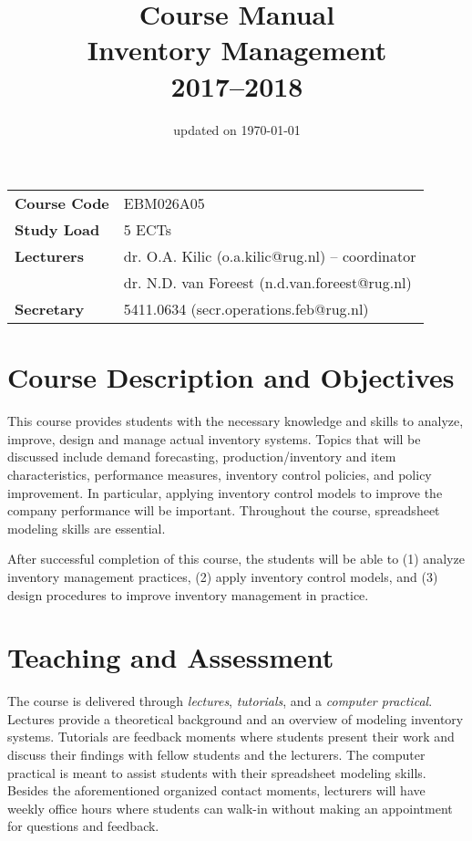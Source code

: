 \documentclass{article}
\title{\bf
	Course Manual \\ 
	Inventory Management \\
	{\normalsize 2017--2018}}
\date{\small updated on \today}
\author{\empty}
\begin{document}
\maketitle

\begin{table}[htbp]
    \begin{tabular}{ll}
    \textbf{Course Code}  	& EBM026A05 \\
    \textbf{Study Load} 	& 5 ECTs \\
    \textbf{Lecturers} 		& dr. O.A. Kilic (o.a.kilic@rug.nl) -- coordinator \\ 
    		  				& dr. N.D. van Foreest (n.d.van.foreest@rug.nl) \\
    \textbf{Secretary} 		& 5411.0634 (secr.operations.feb@rug.nl) \\
    \end{tabular}%
\end{table}%


\setcounter{tocdepth}{2}
\setlength\cftbeforesecskip{2.5pt}
{\small\tableofcontents}

\newpage

\section{Course Description and Objectives}

This course provides students with the necessary knowledge and skills to analyze, improve, design and manage actual inventory systems. Topics that will be discussed include demand forecasting, production/inventory and item characteristics, performance measures, inventory control policies, and policy improvement. In particular, applying inventory control models to improve the company performance will be important. Throughout the course, spreadsheet modeling skills are essential.

After successful completion of this course, the students will be able to (1) analyze inventory management practices, (2) apply inventory control models, and (3) design procedures to improve inventory management in practice.


\section{Teaching and Assessment}

The course is delivered through \textit{lectures}, \textit{tutorials}, and a \textit{computer practical}. Lectures provide a theoretical background and an overview of modeling inventory systems. Tutorials are feedback moments where students present their work and discuss their findings with fellow students and the lecturers. The computer practical is meant to assist students with their spreadsheet modeling skills. Besides the aforementioned organized contact moments, lecturers will have weekly office hours where students can walk-in without making an appointment for questions and feedback. 
 
\end{document}
